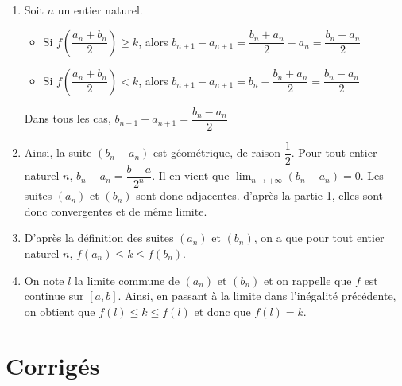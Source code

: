 \documentclass[11pt,fleqn, openany]{book} %
\begin{document}
\begin{solution}
\begin{enumerate}
\item Soit $n$ un entier naturel.
\begin{itemize}
\item Si $ f\left(\dfrac{a_n+b_n}{2}\right) \geqslant k$, alors $b_{n+1}-a_{n+1}=\dfrac{b_n+a_n}{2}-a_n=\dfrac{b_n-a_n}{2}$
\item Si $ f\left(\dfrac{a_n+b_n}{2}\right) < k$, alors $b_{n+1}-a_{n+1}=b_n-\dfrac{b_n+a_n}{2}=\dfrac{b_n-a_n}{2}$
\end{itemize}
Dans tous les cas, $b_{n+1}-a_{n+1}=\dfrac{b_n-a_n}{2}$
\item Ainsi, la suite $(b_n-a_n)$ est géométrique, de raison $\dfrac{1}{2}$. Pour tout entier naturel $n$, $b_n-a_n=\dfrac{b-a}{2^n}$. Il en vient que $\displaystyle\lim_{n \to + \infty}(b_n-a_n)=0$. Les suites $(a_n)$ et $(b_n)$ sont donc adjacentes. d'après la partie 1, elles sont donc convergentes et de même limite.
\item D'après la définition des suites $(a_n)$ et $(b_n)$, on a que pour tout entier naturel $n$, $f(a_n) \leqslant k \leqslant f(b_n)$.
\item On note $l$ la limite commune de $(a_n)$ et $(b_n)$ et on rappelle que $f$ est continue sur $[a,b]$. Ainsi, en passant à la limite dans l'inégalité précédente, on obtient que $f(l) \leqslant k \leqslant f(l)$ et donc que $f(l)=k$.
\end{enumerate}

\end{solution}


\chapter{Corrigés}

\printsolutions[headings={false}]
\end{document}
